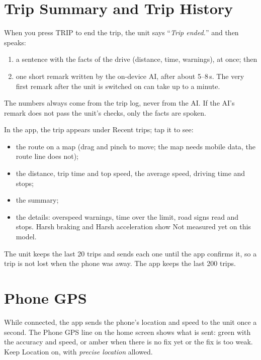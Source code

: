 \documentclass[11pt,a4paper,oneside]{report}
\newcommand{\ui}[1]{\textsf{#1}}
\newcommand{\say}[1]{``\textit{#1}''}
\begin{document}
\section{Trip Summary and Trip History}\label{sec:trips}
When you press \ui{TRIP} to end the trip, the unit says \say{Trip ended.} and then speaks:
\begin{enumerate}[leftmargin=*]
\item a sentence with the facts of the drive (distance, time, warnings), at once; then
\item one short remark written by the on-device AI, after about 5--8\,s. The very first remark after the unit is switched on can take up to a minute.
\end{enumerate}
The numbers always come from the trip log, never from the AI. If the AI's remark does not pass the unit's checks, only the facts are spoken.

In the app, the trip appears under \ui{Recent trips}; tap it to see:
\begin{itemize}[leftmargin=*]
\item the route on a map (drag and pinch to move; the map needs mobile data, the route line does not);
\item the distance, trip time and top speed, the average speed, driving time and stops;
\item the summary;
\item the details: overspeed warnings, time over the limit, road signs read and stops. \ui{Harsh braking} and \ui{Harsh acceleration} show \ui{Not measured yet} on this model.
\end{itemize}
The unit keeps the last 20 trips and sends each one until the app confirms it, so a trip is not lost when the phone was away. The app keeps the last 200 trips.

\section{Phone GPS}
While connected, the app sends the phone's location and speed to the unit once a second. The \ui{Phone GPS} line on the home screen shows what is sent: green with the accuracy and speed, or amber when there is no fix yet or the fix is too weak. Keep Location on, with \emph{precise location} allowed.
\end{document}
